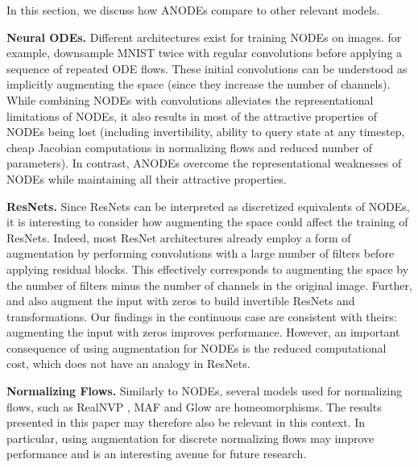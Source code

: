 \documentclass{article}
\begin{document}
In this section, we discuss how ANODEs compare to other relevant models.

\textbf{Neural ODEs.} Different architectures exist for training NODEs on images. \cite{chen2018neural} for example, downsample MNIST twice with regular convolutions before applying a sequence of repeated ODE flows. These initial convolutions can be understood as implicitly augmenting the space (since they increase the number of channels). While combining NODEs with convolutions alleviates the representational limitations of NODEs, it also results in most of the attractive properties of NODEs being lost (including invertibility, ability to query state at any timestep, cheap Jacobian computations in normalizing flows and reduced number of parameters). In contrast, ANODEs overcome the representational weaknesses of NODEs while maintaining all their attractive properties.



\textbf{ResNets.} Since ResNets can be interpreted as discretized equivalents of NODEs, it is interesting to consider how augmenting the space could affect the training of ResNets. Indeed, most ResNet architectures \citep{he2016deep, xie2017aggregated, zagoruyko2016wide} already employ a form of augmentation by performing convolutions with a large number of filters before applying residual blocks. This effectively corresponds to augmenting the space by the number of filters minus the number of channels in the original image. Further, \cite{behrmann2018invertible} and \cite{ardizzone2018analyzing} also augment the input with zeros to build invertible ResNets and transformations. Our findings in the continuous case are consistent with theirs: augmenting the input with zeros improves performance. However, an important consequence of using augmentation for NODEs is the reduced computational cost, which does not have an analogy in ResNets.









\textbf{Normalizing Flows.} Similarly to NODEs, several models used for normalizing flows, such as RealNVP \citep{dinh2016density}, MAF \citep{papamakarios2017masked} and Glow \citep{kingma2018glow} are homeomorphisms. The results presented in this paper may therefore also be relevant in this context. In particular, using augmentation for discrete normalizing flows may improve performance and is an interesting avenue for future research.
\end{document}
